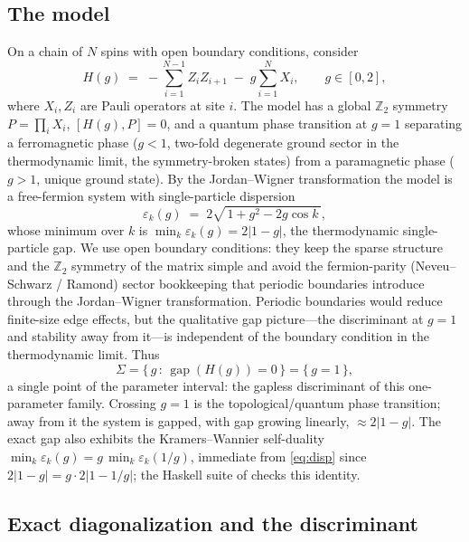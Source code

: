 \documentclass[12pt]{article}
\newcommand{\gapof}[1]{\operatorname{gap}(#1)} %
\newcommand{\Sig}{\Sigma}                       %
\newcommand{\Z}{\mathbb{Z}}
\newcommand{\set}[1]{\{\,#1\,\}}
\theoremstyle{plain}
\theoremstyle{definition}
\theoremstyle{remark}
\begin{document}
\subsection{The model}
\label{sec:numerics-model}

On a chain of $N$ spins with open boundary conditions, consider
\begin{equation}
\label{eq:tfim}
H(g)\;=\;-\sum_{i=1}^{N-1} Z_i Z_{i+1}\;-\;g\sum_{i=1}^{N} X_i,
\qquad g\in[0,2],
\end{equation}
where $X_i,Z_i$ are Pauli operators at site $i$. The model has a global $\Z_2$
symmetry $P=\prod_i X_i$, $[H(g),P]=0$, and a quantum phase transition at $g=1$
separating a ferromagnetic phase ($g<1$, two-fold degenerate ground sector in the
thermodynamic limit, the symmetry-broken states) from a paramagnetic phase ($g>1$,
unique ground state). By the Jordan--Wigner transformation the model is a free-fermion
system with single-particle dispersion
\begin{equation}
\label{eq:disp}
\varepsilon_k(g)\;=\;2\sqrt{\,1+g^2-2g\cos k\,},
\end{equation}
whose minimum over $k$ is $\min_k\varepsilon_k(g)=2\lvert 1-g\rvert$, the
thermodynamic single-particle gap. We use open boundary conditions: they keep the
sparse structure and the $\Z_2$ symmetry of the matrix simple and avoid the
fermion-parity (Neveu--Schwarz / Ramond) sector bookkeeping that periodic boundaries
introduce through the Jordan--Wigner transformation. Periodic boundaries would reduce
finite-size edge effects, but the qualitative gap picture---the discriminant at $g=1$
and stability away from it---is independent of the boundary condition in the
thermodynamic limit. Thus
\begin{equation}
\label{eq:sigma}
\Sig=\set{g\,:\,\gapof{H(g)}=0}=\set{g=1},
\end{equation}
a single point of the parameter interval: the gapless discriminant of this
one-parameter family. Crossing $g=1$ is the topological/quantum phase transition;
away from it the system is gapped, with gap growing linearly, $\approx 2\lvert 1-g\rvert$.
The exact gap also exhibits the Kramers--Wannier self-duality
$\min_k\varepsilon_k(g)=g\,\min_k\varepsilon_k(1/g)$, immediate from \eqref{eq:disp}
since $2\lvert 1-g\rvert=g\cdot 2\lvert 1-1/g\rvert$; the Haskell suite of
 checks this identity.

\subsection{Exact diagonalization and the discriminant}
\label{sec:numerics-ed}
\end{document}
